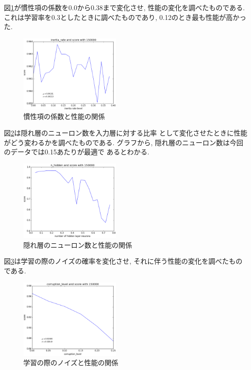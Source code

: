 \documentclass[10pt,a4paper,twocolumn]{jarticle}
\begin{document}
図\ref{fig:inertia-rate-test}が慣性項の係数を0.0から0.38まで変化させ, 
性能の変化を調べたものである. 
これは学習率を0.3としたときに調べたものであり, 
0.12のとき最も性能が高かった. 
\begin{figure}[htbp]
  \centering
  \includegraphics[width=0.45\textwidth]{assets/img/inertia_rate_test_mnist.eps}
  \caption{慣性項の係数と性能の関係}
  \label{fig:inertia-rate-test}
\end{figure}

図\ref{fig:hidden-layer-analyze}は隠れ層のニューロン数を入力層に対する比率
として変化させたときに性能がどう変わるかを調べたものである. 
グラフから, 隠れ層のニューロン数は今回のデータでは0.15あたりが最適で
あるとわかる. 
\begin{figure}[htbp]
  \centering
  \includegraphics[width=0.45\textwidth]{assets/img/n_hidden_test_mnist_score.eps}
  \caption{隠れ層のニューロン数と性能の関係}
  \label{fig:hidden-layer-analyze}
\end{figure}

図\ref{fig:corruption-level-test}は学習の際のノイズの確率を変化させ, 
それに伴う性能の変化を調べたものである. 
\begin{figure}[htbp]
  \centering
  \includegraphics[width=0.45\textwidth]{assets/img/corruption_level_test_mnist.eps}
  \caption{学習の際のノイズと性能の関係}
  \label{fig:corruption-level-test}
\end{figure}
\end{document}
